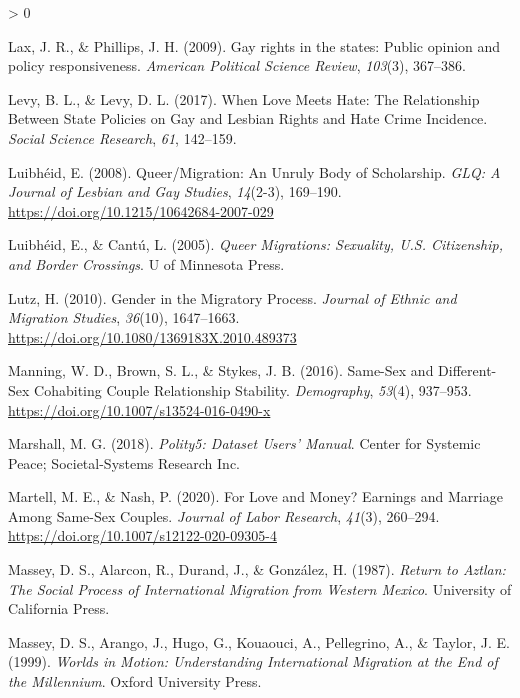 \documentclass[
  11pt,
]{article}
\newlength{\cslhangindent}
\newenvironment{CSLReferences}[2] %
 {%
  \setlength{\parindent}{0pt}
  \ifodd #1 \everypar{\setlength{\hangindent}{\cslhangindent}}\ignorespaces\fi
  \ifnum #2 > 0
  \setlength{\parskip}{#2\baselineskip}
  \fi
 }%
 {}
\begin{document}
\begin{CSLReferences}{1}{0}
\leavevmode\hypertarget{ref-lax_2009}{}%
Lax, J. R., \& Phillips, J. H. (2009). Gay rights in the states: {Public} opinion and policy responsiveness. \emph{American Political Science Review}, \emph{103}(3), 367--386.

\leavevmode\hypertarget{ref-levy_2017}{}%
Levy, B. L., \& Levy, D. L. (2017). When {Love} {Meets} {Hate}: {The} {Relationship} {Between} {State} {Policies} on {Gay} and {Lesbian} {Rights} and {Hate} {Crime} {Incidence}. \emph{Social Science Research}, \emph{61}, 142--159.

\leavevmode\hypertarget{ref-luibheid_2008}{}%
Luibhéid, E. (2008). Queer/{Migration}: {An} {Unruly} {Body} of {Scholarship}. \emph{GLQ: A Journal of Lesbian and Gay Studies}, \emph{14}(2-3), 169--190. \url{https://doi.org/10.1215/10642684-2007-029}

\leavevmode\hypertarget{ref-luibheid_2005}{}%
Luibhéid, E., \& Cantú, L. (2005). \emph{Queer {Migrations}: {Sexuality}, {U}.{S}. {Citizenship}, and {Border} {Crossings}}. U of Minnesota Press.

\leavevmode\hypertarget{ref-lutz_2010}{}%
Lutz, H. (2010). Gender in the {Migratory} {Process}. \emph{Journal of Ethnic and Migration Studies}, \emph{36}(10), 1647--1663. \url{https://doi.org/10.1080/1369183X.2010.489373}

\leavevmode\hypertarget{ref-manning_2016}{}%
Manning, W. D., Brown, S. L., \& Stykes, J. B. (2016). Same-{Sex} and {Different}-{Sex} {Cohabiting} {Couple} {Relationship} {Stability}. \emph{Demography}, \emph{53}(4), 937--953. \url{https://doi.org/10.1007/s13524-016-0490-x}

\leavevmode\hypertarget{ref-marshall_2018}{}%
Marshall, M. G. (2018). \emph{Polity5: {Dataset} {Users}' {Manual}}. Center for Systemic Peace; Societal-Systems Research Inc.

\leavevmode\hypertarget{ref-martell_2020}{}%
Martell, M. E., \& Nash, P. (2020). For {Love} and {Money}? {Earnings} and {Marriage} {Among} {Same}-{Sex} {Couples}. \emph{Journal of Labor Research}, \emph{41}(3), 260--294. \url{https://doi.org/10.1007/s12122-020-09305-4}

\leavevmode\hypertarget{ref-massey_1987}{}%
Massey, D. S., Alarcon, R., Durand, J., \& González, H. (1987). \emph{Return to {Aztlan}: {The} {Social} {Process} of {International} {Migration} from {Western} {Mexico}}. University of California Press.

\leavevmode\hypertarget{ref-massey_1999}{}%
Massey, D. S., Arango, J., Hugo, G., Kouaouci, A., Pellegrino, A., \& Taylor, J. E. (1999). \emph{Worlds in {Motion}: {Understanding} {International} {Migration} at the {End} of the {Millennium}}. Oxford University Press.


\end{CSLReferences}
\end{document}
